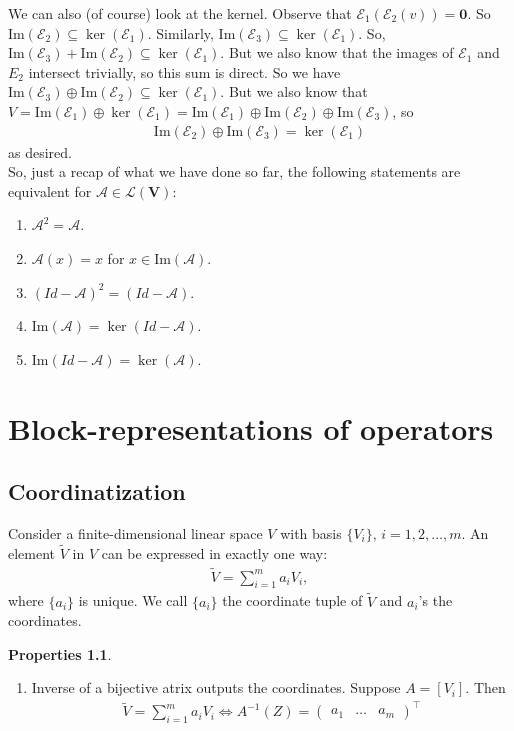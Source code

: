 \documentclass{book}
\theoremstyle{definition}
\newtheorem{prop}{Properties}[section]
\newcommand{\V}{\mathbf{V}}
\newcommand{\A}{\mathcal{A}}
\newcommand{\lag}{\mathcal{L}}
\newcommand{\E}{\mathcal{E}}
\newcommand{\ima}{\text{Im}}
\begin{document}
We can also (of course) look at the kernel. Observe that $\E_1(\E_2(v)) = \mathbf{0}$. So $\ima(\E_2) \subseteq \ker(\E_1)$. Similarly, $\ima(\E_3) \subseteq \ker(\E_1)$. So, $\ima(\E_3) + \ima(\E_2) \subseteq \ker(\E_1)$. But we also know that the images of $\E_1$ and $E_2$ intersect trivially, so this sum is direct. So we have $\ima(\E_3) \oplus \ima(\E_2) \subseteq \ker(\E_1).$ But we also know that $V = \ima(\E_1) \oplus \ker(\E_1) = \ima(\E_1) \oplus \ima(\E_2) \oplus \ima(\E_3) $, so
\begin{align*}
\ima(\E_2) \oplus \ima(\E_3) = \ker(\E_1)
\end{align*}
as desired. \\

So, just a recap of what we have done so far, the following statements are equivalent for $\mathcal{A} \in \lag(\V)$:
\begin{enumerate}
	\item $\A^2 = \A$.
	\item $\A(x) = x$ for $x\in \ima(\A)$.
	\item $(Id - \A)^2 = (Id - \A)$.
	\item $\ima(\A) = \ker(Id - \A)$.
	\item $\ima(Id - \A) = \ker(\A)$.
\end{enumerate}



\newpage
\chapter{Block-representations of operators}

\section{Coordinatization}
Consider a finite-dimensional linear space $V$ with basis $\{V_i \}$, $i=1,2,\dots,m$. An element $\tilde{V}$ in $V$ can be expressed in exactly one way:
\begin{align*}
\tilde{V} = \sum_{i=1}^m a_iV_i,
\end{align*}
where $\{ a_i\}$ is unique. We call $\{ a_i \}$ the coordinate tuple of $\tilde{V}$ and $a_i$'s the coordinates. 
\begin{prop}
	$\,$
	\begin{enumerate}
		\item Inverse of a bijective atrix outputs the coordinates. Suppose $A = [V_i]$. Then
		\begin{align*}
		\tilde{V} = \sum_{i=1}^ma_iV_i \iff A^{-1}(Z) = \begin{pmatrix}
		a_1&\dots&a_m
		\end{pmatrix}^\top
		\end{align*}
	\end{enumerate}
\end{prop}
\end{document}
